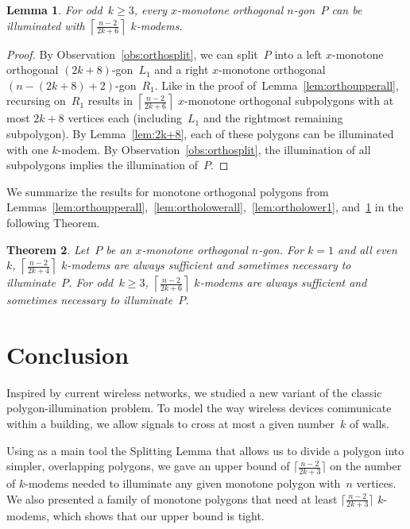 \documentclass[A4]{article}
\newtheorem{theorem}{Theorem}
\newtheorem{lemma}[theorem]{Lemma}
\begin{document}
\begin{lemma}\label{lem:orthoupperodd}
For odd~$k\geq3$, every $x$-monotone orthogonal $n$-gon~$P$ can be illuminated with $\left\lceil \frac{n-2}{2k+6}\right\rceil$ \mbox{$k$-modems}.
\end{lemma}
\begin{proof}
By Observation~\ref{obs:orthosplit}, we can split~$P$ into a left $x$-monotone orthogonal $(2k\!+\!8)$-gon~$L_1$ and a right $x$-monotone orthogonal $(n\!-\!(2k\!+\!8)\!+\!2)$-gon~$R_1$.
Like in the proof of~Lemma~\ref{lem:orthoupperall}, recursing on~$R_1$ results in $\left\lceil \frac{n-2}{2k+6}\right\rceil$ $x$-monotone orthogonal subpolygons with at most $2k\!+\!8$ vertices each (including~$L_1$ and the rightmost remaining subpolygon).
By Lemma~\ref{lem:2k+8}, each of these polygons can be illuminated with one \mbox{$k$-modem}.
By Observation~\ref{obs:orthosplit}, the illumination of all subpolygons implies the illumination of~$P$. \end{proof}


We summarize the results for monotone orthogonal polygons from Lemmas~\ref{lem:orthoupperall},~\ref{lem:ortholowerall},~\ref{lem:ortholower1}, and~\ref{lem:orthoupperodd} in the following Theorem.


\begin{theorem}\label{thm:orthoall}
Let~$P$ be an $x$-monotone orthogonal $n$-gon.
For $k=1$ and all even~$k$, $\left\lceil \frac{n-2}{2k+4} \right\rceil$ \mbox{$k$-modems} are always sufficient and sometimes necessary to illuminate~$P$.
For odd~$k\geq3$, $\left\lceil \frac{n-2}{2k+6}\right\rceil$ \mbox{$k$-modems} are always sufficient and sometimes necessary to illuminate~$P$.
\end{theorem}





\section{Conclusion}

Inspired by current wireless networks, we studied a new variant of the classic polygon-illumination problem.
To model the way wireless devices communicate within a building, we allow signals to cross at most a given number~$k$ of walls.

Using as a main tool the Splitting Lemma that allows us to divide a polygon into simpler, overlapping polygons, we gave an upper bound of $\lceil \frac{n-2}{2k+3} \rceil$ on the number of \mbox{$k$-modems} needed to illuminate any given monotone polygon with~$n$ vertices.
We also presented a family of monotone polygons that need at least $\lceil \frac{n-2}{2k+3} \rceil$ \mbox{$k$-modems}, which shows that our upper bound is tight.
\end{document}
